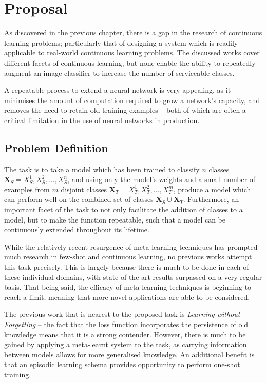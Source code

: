 \documentclass{report}
\begin{document}
	\chapter{Proposal} \label{proposal}
	As discovered in the previous chapter, there is a gap in the research of continuous learning problems; particularly that of designing a system which is readily applicable to real-world continuous learning problems. The discussed works cover different facets of continuous learning, but none enable the ability to repeatedly augment an image classifier to increase the number of serviceable classes. \par
	A repeatable process to extend a neural network is very appealing, as it minimises the amount of computation required to grow a network's capacity, and removes the need to retain old training examples -- both of which are often a critical limitation in the use of neural networks in production.
	
	\section{Problem Definition}
	The task is to take a model which has been trained to classify $n$ classes $\bm{X}_S = {X_S^1, X_S^2, ..., X_S^n}$, and using only the model's weights and a small number of examples from $m$ disjoint classes $\bm{X}_T = {X_T^1, X_T^2, ..., X_T^m}$, produce a model which can perform well on the combined set of classes $\bm{X}_S \cup \bm{X}_T$.
	Furthermore, an important facet of the task to not only facilitate the addition of classes to a model, but to make the function repeatable, such that a model can be continuously extended throughout its lifetime. \par
	While the relatively recent resurgence of meta-learning techniques has prompted much research in few-shot and continuous learning, no previous works attempt this task precisely. This is largely because there is much to be done in each of these individual domains, with state-of-the-art results surpassed on a very regular basis. That being said, the efficacy of meta-learning techniques is beginning to reach a limit, meaning that more novel applications are able to be considered.	\par
	The previous work that is nearest to the proposed task is \textit{Learning without Forgetting}\parencite{lwf} -- the fact that the loss function incorporates the persistence of old knowledge means that it is a strong contender. However, there is much to be gained by applying a meta-learnt system to the task, as carrying information between models allows for more generalised knowledge. An additional benefit is that an episodic learning schema provides opportunity to perform one-shot training. \par
	
\end{document}
